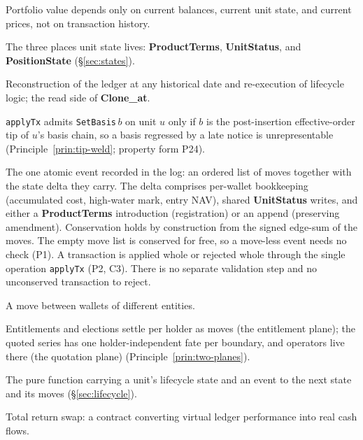\begin{description}[style=nextline]
\item[State-sufficiency] Portfolio value depends only on current balances, current unit state, and current prices, not on transaction history.

\item[Three homes] The three places unit state lives: \textbf{ProductTerms}, \textbf{UnitStatus}, and \textbf{PositionState} (\S\ref{sec:states}).

\item[Time travel] Reconstruction of the ledger at any historical date and re-execution of lifecycle logic; the read side of \textbf{Clone\_at}.

\item[Tip weld] \texttt{applyTx} admits \texttt{SetBasis}\,$b$ on unit $u$ only if $b$ is the post-insertion effective-order tip of $u$'s basis chain, so a basis regressed by a late notice is unrepresentable (Principle~\ref{prin:tip-weld}; property form P24).

\item[Transaction] The one atomic event recorded in the log: an ordered list of moves together with the state delta they carry. The delta comprises per-wallet bookkeeping (accumulated cost, high-water mark, entry NAV), shared \textbf{UnitStatus} writes, and either a \textbf{ProductTerms} introduction (registration) or an append (preserving amendment). Conservation holds by construction from the signed edge-sum of the moves. The empty move list is conserved for free, so a move-less event needs no check (P1). A transaction is applied whole or rejected whole through the single operation \texttt{applyTx} (P2, C3). There is no separate validation step and no unconserved transaction to reject.

\item[Transfer] A move between wallets of different entities.

\item[Two planes] Entitlements and elections settle per holder as moves (the entitlement plane); the quoted series has one holder-independent fate per boundary, and operators live there (the quotation plane) (Principle~\ref{prin:two-planes}).

\item[Transition function] The pure function carrying a unit's lifecycle state and an event to the next state and its moves (\S\ref{sec:lifecycle}).

\item[TRS] Total return swap: a contract converting virtual ledger performance into real cash flows.


\end{description}
